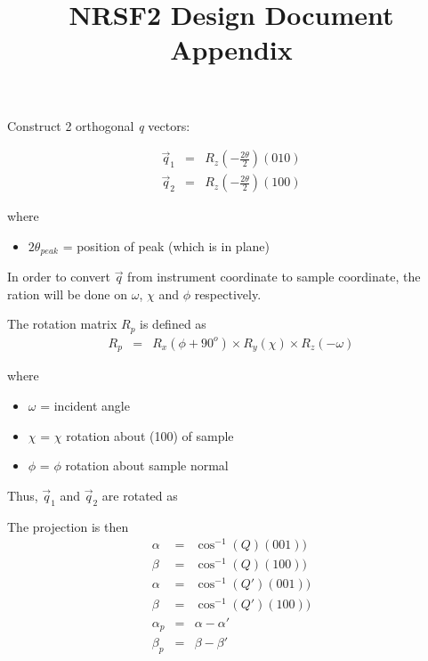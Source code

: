 \documentclass[12pt,bezier,amstex]{report}  %
\title{NRSF2 Design Document Appendix}
\begin{document}
\maketitle

Construct 2 orthogonal {\it q} vectors:

\begin{eqnarray*}
\vec{q}_1 &=& 
	R_z (- \frac{2\theta}{2}) (010)  \\
\vec{q}_2 &=&
	R_z(-\frac{2\theta}{2}) (100)
\end{eqnarray*}

where 
\begin{itemize}
\item	$2\theta_{peak}$ = position of peak (which is in plane)
\end{itemize}

In order to convert $\vec{q}$ from instrument coordinate to sample coordinate, the ration will be done on
$\omega$, $\chi$ and $\phi$ respectively. 

The rotation matrix $R_p$ is defined as
\begin{eqnarray*}
R_p &=& R_x(\phi + 90^o) \times R_y(\chi) \times R_z(-\omega)
\end{eqnarray*}

where 
\begin{itemize}
\item	$\omega$ = incident angle
\item	$\chi$ = $\chi$ rotation about (100) of sample
\item	$\phi$ =  $\phi$ rotation about sample normal
\end{itemize}

Thus, $\vec{q}_1$ and $\vec{q}_2$ are rotated as


The projection is then
\begin{eqnarray*}
\alpha
	&=& \cos^{-1}(Q) (001))	\\
\beta
	&=& \cos^{-1}(Q) (100))	\\
\alpha
	&=& \cos^{-1}(Q\prime) (001))	\\
\beta
	&=& \cos^{-1}(Q\prime) (100))	\\
\alpha_p
	&=& \alpha - \alpha\prime	\\
\beta_p
	&=& \beta - \beta\prime
\end{eqnarray*}
\end{document}
